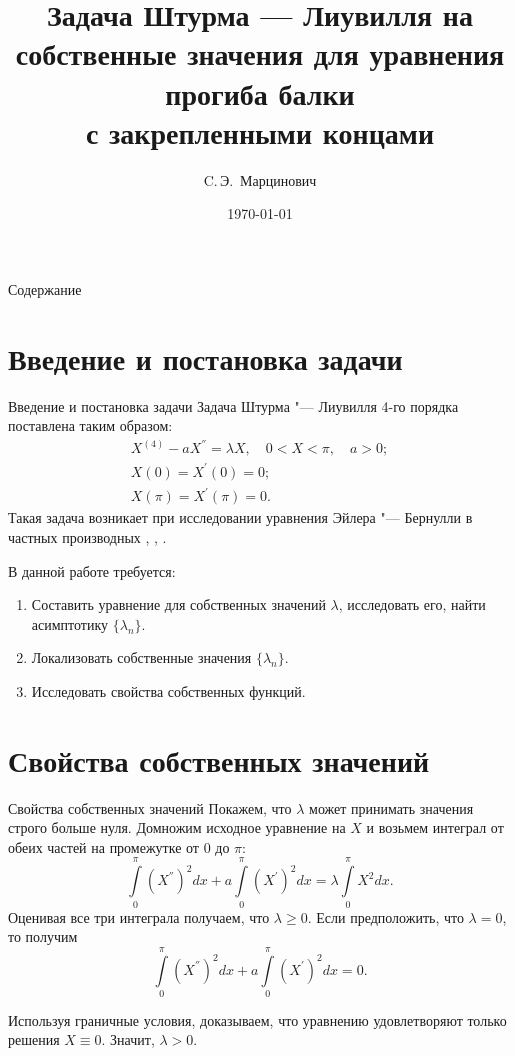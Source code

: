 \documentclass[10pt, ignoreonframetext,unicode]{beamer}
\title[Задача Штурма "--- Лиувилля]{Задача Штурма --- Лиувилля на собственные значения для уравнения прогиба балки \\ с закрепленными концами}
\author{C.\,Э.~Марцинович}
\institute[МГТУ]{МГТУ им. Н.\,Э.~Баумана}
\date{\today}
\begin{document}
\begin{frame}[plain]
\maketitle
\end{frame}


\begin{frame}{Содержание}
\tableofcontents%
\end{frame}


\section{Введение и постановка задачи}
\begin{frame}{Введение и постановка задачи}
	Задача Штурма "--- Лиувилля 4-го порядка поставлена таким образом:
	\begin{gather*}
	X^{(4)} - aX^{''} = \lambda X, \quad 0<X<\pi,\quad a>0;\label{I} \\ 
	X(0) = X^{'}(0) = 0;\label{II} \\
	X(\pi) = X^{'}(\pi) = 0. \label{III}
	\end{gather*}
	Такая задача возникает при исследовании уравнения Эйлера "--- Бернулли в частных производных \cite{Rudakov2019_Euler}, \cite{Rudakov2020_1}, \cite{Rudakov2020_2}.
	
	В данной работе требуется: 
	\begin{enumerate}
		\item Составить уравнение для собственных значений $\lambda$, исследовать его, найти асимп\-тотику $\{\lambda_n\}$. 
		\item Локализовать собственные значения $\{\lambda_n\}$. 
		\item Исследовать свойства собственных функций.
	\end{enumerate}
\end{frame}

\section{Свойства собственных значений}
\begin{frame}{Свойства собственных значений}
	Покажем, что $\lambda$ может принимать значения строго больше нуля. Домножим исходное урав\-не\-ние на $X$ и возьмем интеграл от обеих частей на промежутке от $0$ до $\pi$:
	\begin{equation*} \label{integral}
	\int\limits_0^\pi(X ^{''})^2 dx + a\int\limits_0^\pi (X^{'})^2 dx = \lambda \int\limits_0^\pi X^2 dx.
	\end{equation*}
	Оценивая все три интеграла получаем, что $\lambda \ge 0$.
	Если предположить, что $\lambda = 0$, то получим
	\[
	\int\limits_0^\pi(X ^{''})^2 dx + a\int\limits_0^\pi (X^{'})^2 dx  =0.
	\]
	
	Используя граничные условия, доказываем, что уравнению удов\-лет\-воряют только решения $X\equiv 0$.
	Значит, $\lambda >0$.
\end{frame}
\end{document}
